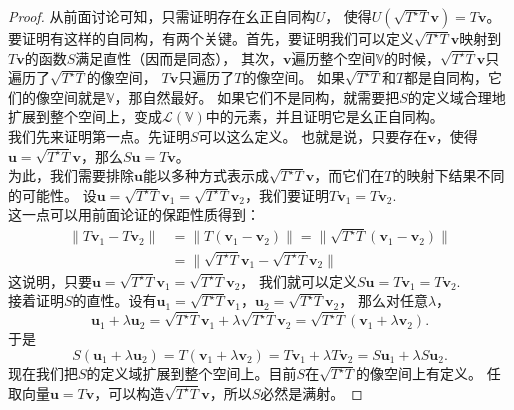 \documentclass[12pt,UTF8,fontset=none]{ctexbook}
\begin{document}
\begin{proof} %
    从前面讨论可知，只需证明存在幺正自同构$U$，
    使得$U(\sqrt{T^\star T} \mathbf{v}) = T\mathbf{v}$。\\
    要证明有这样的自同构，有两个关键。首先，要证明我们可以定义$\sqrt{T^\star T} \mathbf{v}$映射到$T\mathbf{v}$的函数$S$满足直性（因而是同态），
    其次，$\mathbf{v}$遍历整个空间$\mathbb{V}$的时候，$\sqrt{T^\star T} \mathbf{v}$只遍历了$\sqrt{T^\star T}$的像空间，
    $T\mathbf{v}$只遍历了$T$的像空间。
    如果$\sqrt{T^\star T}$和$T$都是自同构，它们的像空间就是$\mathbb{V}$，那自然最好。
    如果它们不是同构，就需要把$S$的定义域合理地扩展到整个空间上，变成$\mathcal{L}(\mathbb{V})$中的元素，并且证明它是幺正自同构。\\
    我们先来证明第一点。先证明$S$可以这么定义。
    也就是说，只要存在$\mathbf{v}$，使得$\mathbf{u} = \sqrt{T^\star T} \mathbf{v}$，那么$S\mathbf{u} = T\mathbf{v}$。\\
    为此，我们需要排除$\mathbf{u}$能以多种方式表示成$\sqrt{T^\star T} \mathbf{v}$，而它们在$T$的映射下结果不同的可能性。
    设$\mathbf{u} = \sqrt{T^\star T} \mathbf{v}_1 = \sqrt{T^\star T} \mathbf{v}_2$，我们要证明$T\mathbf{v}_1 = T\mathbf{v}_2.$\\
    这一点可以用前面论证的保距性质得到：
    \begin{align*}
        \|T\mathbf{v}_1 - T\mathbf{v}_2\| &= \|T(\mathbf{v}_1 - \mathbf{v}_2)\| = \| \sqrt{T^\star T}(\mathbf{v}_1 - \mathbf{v}_2)\|  \\
        &= \| \sqrt{T^\star T} \mathbf{v}_1 - \sqrt{T^\star T} \mathbf{v}_2\|  
    \end{align*}    
    这说明，只要$\mathbf{u} = \sqrt{T^\star T} \mathbf{v}_1 = \sqrt{T^\star T} \mathbf{v}_2$，
    我们就可以定义$S\mathbf{u} = T\mathbf{v}_1 = T\mathbf{v}_2.$ \\
    接着证明$S$的直性。设有$\mathbf{u}_1 = \sqrt{T^\star T} \mathbf{v}_1$，$\mathbf{u}_2 = \sqrt{T^\star T} \mathbf{v}_2$，
    那么对任意$\lambda$，
    $$ \mathbf{u}_1 + \lambda \mathbf{u}_2 = \sqrt{T^\star T} \mathbf{v}_1 + \lambda \sqrt{T^\star T} \mathbf{v}_2 = \sqrt{T^\star T} (\mathbf{v}_1 + \lambda \mathbf{v}_2).$$
    于是
    $$ S(\mathbf{u}_1 + \lambda \mathbf{u}_2) = T (\mathbf{v}_1 + \lambda \mathbf{v}_2) = T\mathbf{v}_1 + \lambda T\mathbf{v}_2 = S\mathbf{u}_1 + \lambda S\mathbf{u}_2.$$
    现在我们把$S$的定义域扩展到整个空间上。目前$S$在$\sqrt{T^\star T}$的像空间上有定义。
    任取向量$\mathbf{u} = T\mathbf{v}$，可以构造$\sqrt{T^\star T} \mathbf{v}$，所以$S$必然是满射。

\end{proof}
\end{document}
